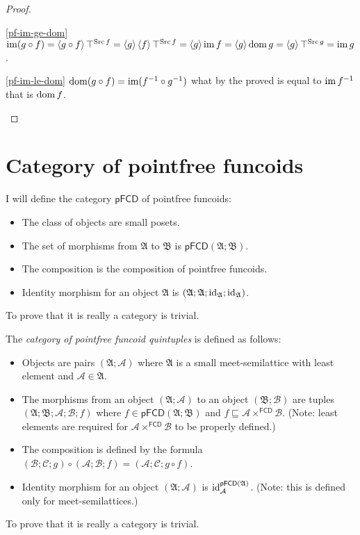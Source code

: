 \begin{proof}
~
\begin{widedisorder}
\item [{\ref{pf-im-ge-dom}}] $\operatorname{im}(g\circ f)=\left\langle g\circ f\right\rangle\top^{\operatorname{Src} f}=\left\langle g\right\rangle\left\langle f\right\rangle\top^{\operatorname{Src} f}=\left\langle g\right\rangle\operatorname{im} f=\left\langle g\right\rangle\operatorname{dom} g=\left\langle g\right\rangle\top^{\operatorname{Src} g}=\operatorname{im} g$.
\item [{\ref{pf-im-le-dom}}] $\operatorname{dom}(g\circ f)=\operatorname{im}(f^{-1}\circ g^{-1})$
what by the proved is equal to $\operatorname{im} f^{-1}$ that is $\operatorname{dom} f$.
\end{widedisorder}
\end{proof}

\section{Category of pointfree funcoids}

I will define the category
$\mathsf{pFCD}$ of pointfree funcoids:
\begin{itemize}
\item The class of objects are small posets.
\item The set of morphisms from $\mathfrak{A}$ to $\mathfrak{B}$ is $\mathsf{pFCD}(\mathfrak{A};\mathfrak{B})$.
\item The composition is the composition of pointfree funcoids.
\item Identity morphism for an object $\mathfrak{A}$ is $(\mathfrak{A};\mathfrak{A};\operatorname{id}_{\mathfrak{A}};\operatorname{id}_{\mathfrak{A}})$.
\end{itemize}
To prove that it is really a category is trivial.

The \emph{category of
pointfree funcoid quintuples} is defined as follows:
\begin{itemize}
\item Objects are pairs $(\mathfrak{A};\mathcal{A})$ where $\mathfrak{A}$
is a small meet-semilattice with least element and $\mathcal{A}\in\mathfrak{A}$.
\item The morphisms from an object $(\mathfrak{A};\mathcal{A})$ to an object
$(\mathfrak{B};\mathcal{B})$ are tuples $(\mathfrak{A};\mathfrak{B};\mathcal{A};\mathcal{B};f)$
where $f\in\mathsf{pFCD}(\mathfrak{A};\mathfrak{B})$ and $f\sqsubseteq\mathcal{A}\times^{\mathsf{FCD}}\mathcal{B}$.
(Note: least elements are required for $\mathcal{A}\times^{\mathsf{FCD}}\mathcal{B}$
to be properly defined.)
\item The composition is defined by the formula $(\mathcal{B};\mathcal{C};g)\circ(\mathcal{A};\mathcal{B};f)=(\mathcal{A};\mathcal{C};g\circ f)$.
\item Identity morphism for an object $(\mathfrak{A};\mathcal{A})$ is $\operatorname{id}_{\mathcal{A}}^{\mathsf{pFCD}(\mathfrak{A})}$.
(Note: this is defined only for meet-semilattices.)
\end{itemize}
To prove that it is really a category is trivial.



